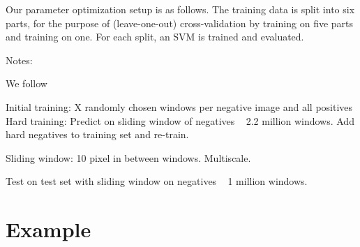 \documentclass[thesis.tex]{subfiles}
\begin{document}
Our parameter optimization setup is as follows. The training data is split into six parts, for the purpose of (leave-one-out) cross-validation by training on five parts and training on one. For each split, an SVM is trained and evaluated.

Notes:

We follow \citet{dalal2005histograms}

Initial training: X randomly chosen windows per negative image and all positives
Hard training: Predict on sliding window of negatives ~ 2.2 million windows. Add hard negatives to training set and re-train.

Sliding window: 10 pixel in between windows. Multiscale.

Test on test set with sliding window on negatives ~ 1 million windows.

\section{Example}
\end{document}
